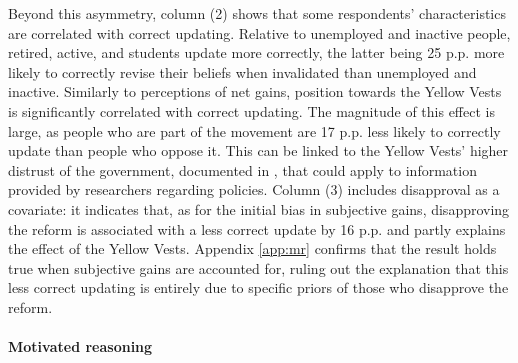 \documentclass[11pt]{article}
\begin{document}
Beyond this asymmetry, column (2) shows that some respondents' characteristics are correlated with correct updating. Relative to unemployed and inactive people, retired, active, and students update more correctly, the latter being 25 p.p. more likely to correctly revise their beliefs when invalidated than unemployed and inactive. Similarly to perceptions of net gains, position towards the Yellow Vests is significantly correlated with correct updating. The magnitude of this effect is large, as people who are part of the movement are 17 p.p. less likely to correctly update than people who oppose it. This can be linked to the Yellow Vests' higher distrust of the government, documented in \citet{algan_et_al_19}, that could apply to information provided by researchers regarding policies. Column (3) includes disapproval as a covariate: it indicates that, as for the initial bias in subjective gains, disapproving the reform is associated with a less correct update by 16 p.p. and partly explains the effect of the Yellow Vests. Appendix \ref{app:mr} confirms that the result holds true when subjective gains are accounted for, ruling out the explanation that this less correct updating is entirely due to specific priors of those who disapprove the reform. 

\paragraph{Motivated reasoning} %

\end{document}
